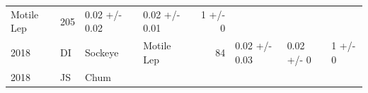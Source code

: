 \documentclass[fleqn,10pt]{wlpeerj} %
\begin{document}
\begin{longtable}[]{@{}llllrlll@{}}
\begin{minipage}[t]{0.11\columnwidth}
Motile Lep\strut
\end{minipage} & \begin{minipage}[t]{0.04\columnwidth}\raggedleft\strut
205\strut
\end{minipage} & \begin{minipage}[t]{0.14\columnwidth}\raggedright\strut
0.02 +/- 0.02\strut
\end{minipage} & \begin{minipage}[t]{0.14\columnwidth}\raggedright\strut
0.02 +/- 0.01\strut
\end{minipage} & \begin{minipage}[t]{0.14\columnwidth}\raggedright\strut
1 +/- 0\strut
\end{minipage}\tabularnewline
\begin{minipage}[t]{0.09\columnwidth}\raggedright\strut
2018\strut
\end{minipage} & \begin{minipage}[t]{0.06\columnwidth}\raggedright\strut
DI\strut
\end{minipage} & \begin{minipage}[t]{0.06\columnwidth}\raggedright\strut
Sockeye\strut
\end{minipage} & \begin{minipage}[t]{0.11\columnwidth}\raggedright\strut
Motile Lep\strut
\end{minipage} & \begin{minipage}[t]{0.04\columnwidth}\raggedleft\strut
84\strut
\end{minipage} & \begin{minipage}[t]{0.14\columnwidth}\raggedright\strut
0.02 +/- 0.03\strut
\end{minipage} & \begin{minipage}[t]{0.14\columnwidth}\raggedright\strut
0.02 +/- 0\strut
\end{minipage} & \begin{minipage}[t]{0.14\columnwidth}\raggedright\strut
1 +/- 0\strut
\end{minipage}\tabularnewline
\begin{minipage}[t]{0.09\columnwidth}\raggedright\strut
2018\strut
\end{minipage} & \begin{minipage}[t]{0.06\columnwidth}\raggedright\strut
JS\strut
\end{minipage} & \begin{minipage}[t]{0.06\columnwidth}\raggedright\strut
Chum\strut
\end{minipage} & \begin{minipage}[t]{0.11\columnwidth}\raggedright\strut

\end{minipage}
\end{longtable}
\end{document}
